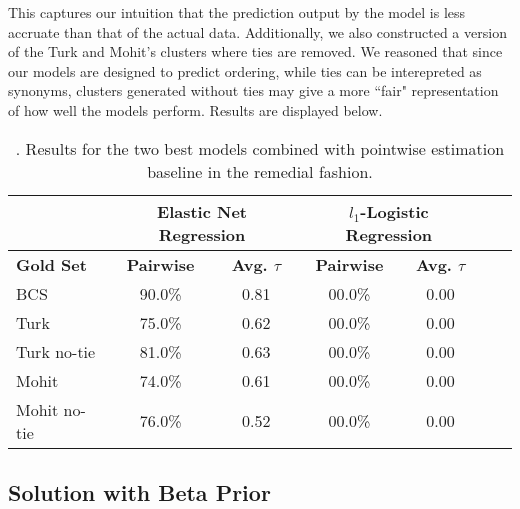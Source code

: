 This captures our intuition that the prediction output by the model is less accruate than that of the actual data. Additionally, we also constructed a version of the Turk and Mohit's clusters where ties are removed. We reasoned that since our models are designed to predict ordering, while ties can be interepreted as synonyms, clusters generated without ties may give a more ``fair" representation of how well the models perform. Results are displayed below. 

\begin{table}
\small
\centering
\begin{tabular}{|l|cc|cc|cc|}
	\hline 
	& \multicolumn{2}{c|}{Elastic Net Regression } 
	& \multicolumn{2}{c|}{$l_1$-Logistic Regression} \\
	\hline 
	\bf Gold Set
	& \bf Pairwise & \bf Avg. $\tau$  
	& \bf Pairwise & \bf Avg. $\tau$  \\ 
	\hline
	BCS          & 90.0\% & 0.81 & 00.0\%  &  0.00 \\
	Turk         & 75.0\% & 0.62 & 00.0\%  &  0.00 \\
	Turk no-tie  & 81.0\% & 0.63 & 00.0\%  &  0.00 \\
	Mohit        & 74.0\% & 0.61 & 00.0\%  &  0.00 \\
	Mohit no-tie & 76.0\% & 0.52 & 00.0\%  &  0.00 \\
	\hline
\end{tabular}
\caption{\label{font-table}. Results for the two best models combined with pointwise estimation baseline in the remedial fashion. }
\end{table}

\subsection{Solution with Beta Prior}

